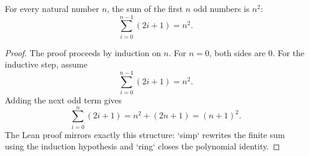 
\begin{theorem}
  \label{thm:sum_first_odds}
  \leanok
  For every natural number $n$, the sum of the first $n$ odd numbers is $n^2$:
  \[
    \sum_{i=0}^{n-1} (2i + 1) = n^2.
  \]
\end{theorem}

\begin{proof}
  The proof proceeds by induction on $n$.
  For $n = 0$, both sides are $0$.
  For the inductive step, assume
  \[
    \sum_{i=0}^{n-1} (2i + 1) = n^2.
  \]
  Adding the next odd term gives
  \[
    \sum_{i=0}^{n} (2i + 1) = n^2 + (2n + 1) = (n+1)^2.
  \]
  The Lean proof mirrors exactly this structure: `simp` rewrites the finite
  sum using the induction hypothesis and `ring` closes the polynomial identity.
\end{proof}
